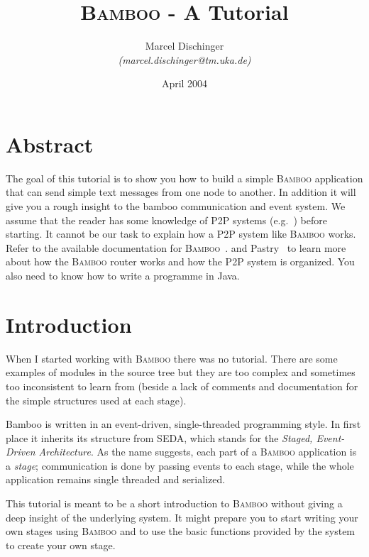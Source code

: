 \documentclass[twocolumn, twoside, a4paper]{article}
\begin{document}
\title{\textsc{Bamboo} - A Tutorial}
\author{Marcel Dischinger\\
  \emph{(marcel.dischinger@tm.uka.de)}}
\date{April 2004}
\maketitle

\section*{Abstract}
\label{sec:Abstract}

The goal of this tutorial is to show you how to build a simple \textsc{Bamboo}
application that can send simple text messages from one node to
another. In addition it will give you a rough insight to the bamboo
communication and event system. We assume that the reader has some 
knowledge of P2P systems (e.g.~\cite{oceanstore})
before starting.
It cannot be our task to explain how a P2P system like
\textsc{Bamboo} works. Refer to the available documentation for
\textsc{Bamboo}~\cite{bamboo}.
and Pastry~\cite{pastry} to
learn more about how the \textsc{Bamboo} router works and how the P2P system
is organized. You also need to know how to write a programme in Java.

\section{Introduction}
\label{sec:Introduction}

When I started working with \textsc{Bamboo} there was no tutorial.
There are some examples of modules in the source tree but they
are too complex and sometimes too inconsistent to learn from (beside a
lack of comments and documentation for the simple structures used at each
stage).

Bamboo is written in an event-driven, single-threaded programming
style. In first place it inherits its structure from SEDA, which
stands for the \emph{Staged, Event-Driven Architecture}. As the name
suggests, each part of a \textsc{Bamboo} application is a \emph{stage};
communication is done by passing events to each stage, while the whole
application remains single threaded and serialized.

This tutorial is meant to be a short introduction to
\textsc{Bamboo} without giving a deep insight of the underlying system. It might
prepare you to start writing your own stages using \textsc{Bamboo} and
to use the basic functions provided by the system to create your own
stage. 
\end{document}
